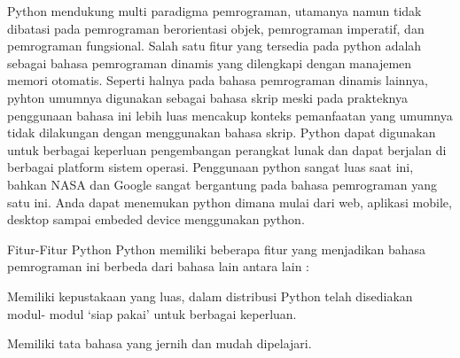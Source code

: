 {\fontsize{14pt}{14pt}\selectfont Python mendukung multi paradigma pemrograman, utamanya namun tidak\vspace{\baselineskip}
dibatasi pada pemrograman berorientasi objek, pemrograman imperatif, dan\vspace{\baselineskip}
pemrograman fungsional. Salah satu fitur yang tersedia pada python adalah sebagai\vspace{\baselineskip}
bahasa pemrograman dinamis yang dilengkapi dengan manajemen memori otomatis.\vspace{\baselineskip}
Seperti halnya pada bahasa pemrograman dinamis lainnya, pyhton umumnya\vspace{\baselineskip}
digunakan sebagai bahasa skrip meski pada prakteknya penggunaan bahasa ini lebih\vspace{\baselineskip}
luas mencakup konteks pemanfaatan yang umumnya tidak dilakungan dengan\vspace{\baselineskip}
menggunakan bahasa skrip. Python dapat digunakan untuk berbagai keperluan\vspace{\baselineskip}
pengembangan perangkat lunak dan dapat berjalan di berbagai platform sistem\vspace{\baselineskip}
operasi.\vspace{\baselineskip}
Penggunaan python sangat luas saat ini, bahkan NASA dan Google sangat\vspace{\baselineskip}
bergantung pada bahasa pemrograman yang satu ini. Anda dapat menemukan python\vspace{\baselineskip}
dimana mulai dari web, aplikasi mobile, desktop sampai embeded device\vspace{\baselineskip}
menggunakan python. \\} \par
\noindent 
{\fontsize{14pt}{14pt}\selectfont Fitur-Fitur Python\vspace{\baselineskip}
Python memiliki beberapa fitur yang menjadikan bahasa pemrograman ini\vspace{\baselineskip}
berbeda dari bahasa lain antara lain : \\} \par
\noindent 
{\fontsize{14pt}{14pt}\selectfont  Memiliki kepustakaan yang luas, dalam distribusi Python telah disediakan modul-\vspace{\baselineskip}
modul ‘siap pakai’ untuk berbagai keperluan. \\} \par
\noindent 
{\fontsize{14pt}{14pt}\selectfont Memiliki tata bahasa yang jernih dan mudah dipelajari. \\} \par
